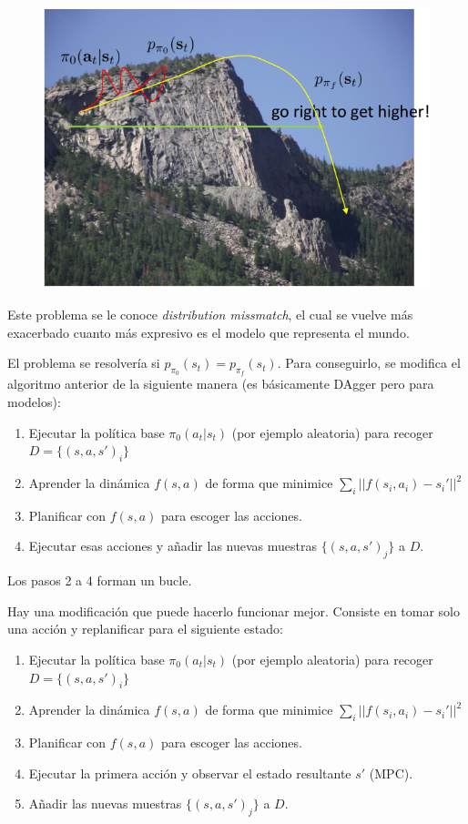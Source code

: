 \begin{figure}[H]
	\centering
	\includegraphics[width=0.5\linewidth]{figures/2020-06-21-205040_611x446_scrot.png}
\end{figure}

Este problema se le conoce \textit{distribution missmatch}, el cual se vuelve más
exacerbado cuanto más expresivo es el modelo que representa el mundo.

El problema se resolvería si $p_{\pi_0}(s_t)=p_{\pi_f}(s_t)$. Para conseguirlo, se
modifica el algoritmo anterior de la siguiente manera (es básicamente DAgger pero para modelos):

\begin{enumerate}
    \item Ejecutar la política base $\pi_0(a_t|s_t)$ (por ejemplo aleatoria) para recoger
        $D=\{(s,a,s')_i\}$
    \item Aprender la dinámica $f(s,a)$ de forma que minimice  $\sum_i
        ||f(s_i,a_i)-s_i'||^2$
    \item Planificar con $f(s,a)$ para escoger las acciones.
    \item Ejecutar esas acciones y añadir las nuevas muestras $\{(s,a,s')_j\}$ a  $D$.
\end{enumerate}

Los pasos 2 a 4 forman un bucle.

Hay una modificación que puede hacerlo funcionar mejor. Consiste en tomar solo una acción y
replanificar para el siguiente estado:

\begin{enumerate}
    \item Ejecutar la política base $\pi_0(a_t|s_t)$ (por ejemplo aleatoria) para recoger
        $D=\{(s,a,s')_i\}$
    \item Aprender la dinámica $f(s,a)$ de forma que minimice  $\sum_i
        ||f(s_i,a_i)-s_i'||^2$
    \item Planificar con $f(s,a)$ para escoger las acciones.
    \item Ejecutar la primera acción y observar el estado resultante $s'$ (MPC).
    \item Añadir las nuevas muestras $\{(s,a,s')_j\}$ a  $D$.
\end{enumerate}

